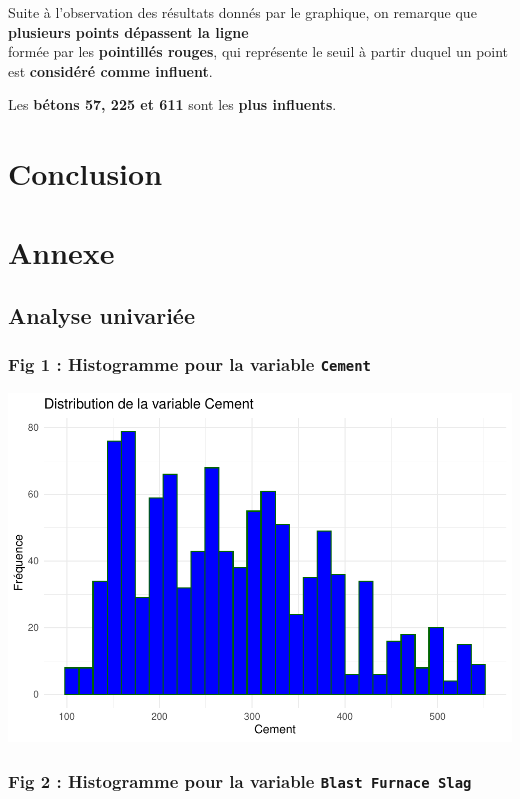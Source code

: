 \documentclass[
  12pt,
]{article}
\begin{document}
Suite à l'observation des résultats donnés par le graphique, on remarque
que \textbf{plusieurs points dépassent la ligne}\\
formée par les \textbf{pointillés rouges}, qui représente le seuil à
partir duquel un point est \textbf{considéré comme influent}.

Les \textbf{bétons 57, 225 et 611} sont les \textbf{plus influents}.

\section{Conclusion}\label{conclusion}

\section{Annexe}\label{annexe}

\subsection{Analyse univariée}\label{analyse-univariuxe9e}

\subsubsection{\texorpdfstring{Fig 1 : Histogramme pour la variable
\texttt{Cement}}{Fig 1 : Histogramme pour la variable Cement}}\label{fig-1-histogramme-pour-la-variable-cement}

\includegraphics{rmd_final_files/figure-latex/unnamed-chunk-23-1.pdf}

\subsubsection{\texorpdfstring{Fig 2 : Histogramme pour la variable
\texttt{Blast\ Furnace\ Slag}}{Fig 2 : Histogramme pour la variable Blast Furnace Slag}}\label{fig-2-histogramme-pour-la-variable-blast-furnace-slag}
\end{document}
